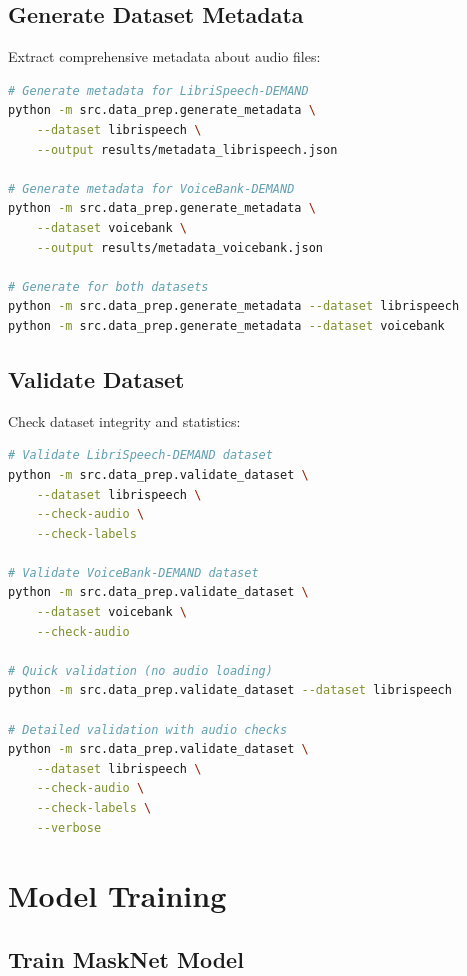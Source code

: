 \documentclass[12pt,a4paper]{article}
\begin{document}
\subsection{Generate Dataset Metadata}

Extract comprehensive metadata about audio files:

\begin{lstlisting}[language=bash]
# Generate metadata for LibriSpeech-DEMAND
python -m src.data_prep.generate_metadata \
    --dataset librispeech \
    --output results/metadata_librispeech.json

# Generate metadata for VoiceBank-DEMAND
python -m src.data_prep.generate_metadata \
    --dataset voicebank \
    --output results/metadata_voicebank.json

# Generate for both datasets
python -m src.data_prep.generate_metadata --dataset librispeech
python -m src.data_prep.generate_metadata --dataset voicebank
\end{lstlisting}

\subsection{Validate Dataset}

Check dataset integrity and statistics:

\begin{lstlisting}[language=bash]
# Validate LibriSpeech-DEMAND dataset
python -m src.data_prep.validate_dataset \
    --dataset librispeech \
    --check-audio \
    --check-labels

# Validate VoiceBank-DEMAND dataset
python -m src.data_prep.validate_dataset \
    --dataset voicebank \
    --check-audio

# Quick validation (no audio loading)
python -m src.data_prep.validate_dataset --dataset librispeech

# Detailed validation with audio checks
python -m src.data_prep.validate_dataset \
    --dataset librispeech \
    --check-audio \
    --check-labels \
    --verbose
\end{lstlisting}

\section{Model Training}

\subsection{Train MaskNet Model}
\end{document}
